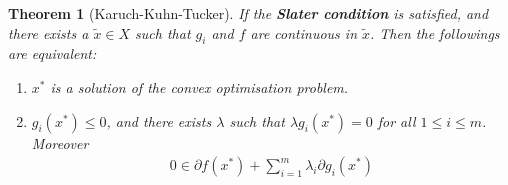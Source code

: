 \documentclass[a4paper,12pt,oneside,fleqn]{book}
\newtheorem{theorem}{Theorem}[section]
\theoremstyle{definition}
\theoremstyle{remark}
\begin{document}
\begin{theorem}[Karuch-Kuhn-Tucker]
	If the \textbf{Slater condition} is satisfied, and there exists a $\tilde{x} \in X$ such that $g_i$ and $f$ are continuous in $\tilde{x}$. Then the followings are equivalent:
	\begin{enumerate}
		\item $x^*$ is a solution of the convex optimisation problem.
		\item $g_i(x^*) \le 0$, and there exists $\lambda$ such that $\lambda g_i(x^*) = 0$ for all $1 \le i \le m$. Moreover
		\begin{align*}
			0 \in \partial f(x^*) + \sum_{i = 1}^m \lambda_i \partial g_i(x^*) 
		\end{align*}
	\end{enumerate}
\end{theorem}
\end{document}
